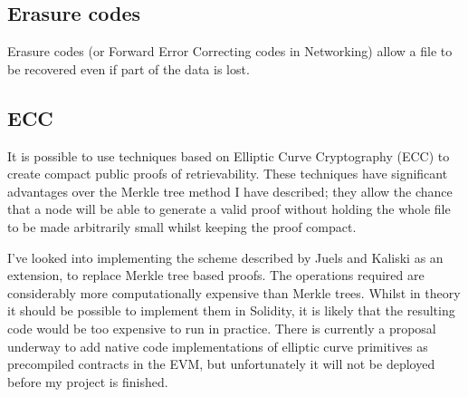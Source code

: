 \documentclass[12pt,a4paper,twoside,openright]{report}
\begin{document}
%
%
%
%
%
%
%

\subsection{Erasure codes}

Erasure codes (or Forward Error Correcting codes in Networking) allow a file to be recovered even if part of the data is lost.



\subsection{ECC}

It is possible to use techniques based on Elliptic Curve Cryptography (ECC) to create compact public proofs of retrievability.
These techniques have significant advantages over the Merkle tree method I have described; they allow the chance
that a node will be able to generate a valid proof without holding the whole file to be made arbitrarily small whilst keeping the proof compact.

I've looked into implementing the scheme described by Juels and Kaliski\cite{ecc-por} as an extension, to replace Merkle tree based proofs.
The operations required are considerably more computationally expensive than Merkle trees.
Whilst in theory it should be possible to implement them in Solidity, it is likely that the resulting code would be too expensive to run in practice.
There is currently a proposal underway to add native code implementations of elliptic curve primitives
as precompiled contracts in the EVM\cite{eip-ecc}, but unfortunately it will not be deployed before my project is finished.
\end{document}
